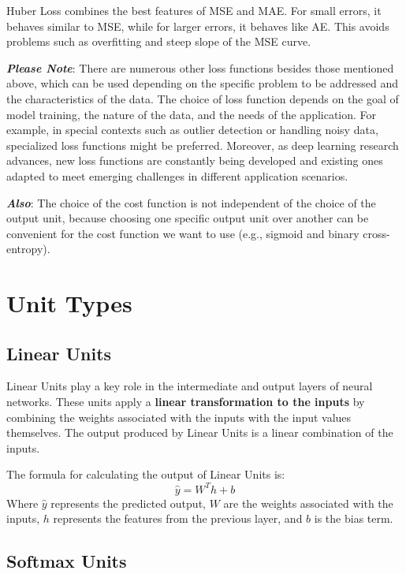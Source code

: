 Huber Loss combines the best features of MSE and MAE. For small errors, it behaves similar to MSE, while for larger errors, it behaves like AE. This avoids problems such as overfitting and steep slope of the MSE curve.

\textit{\textbf{Please Note}}: There are numerous other loss functions besides those mentioned above, which can be used depending on the specific problem to be addressed and the characteristics of the data. The choice of loss function depends on the goal of model training, the nature of the data, and the needs of the application. For example, in special contexts such as outlier detection or handling noisy data, specialized loss functions might be preferred. Moreover, as deep learning research advances, new loss functions are constantly being developed and existing ones adapted to meet emerging challenges in different application scenarios. 

\textit{\textbf{Also}}: The choice of the cost function is not independent of the choice of the output unit, because choosing one specific output unit over another can be convenient for the cost function we want to use (e.g., sigmoid and binary cross-entropy).

\section{Unit Types}

\subsection{Linear Units}

Linear Units play a key role in the intermediate and output layers of neural networks. These units apply a \textbf{linear transformation to the inputs} by combining the weights associated with the inputs with the input values themselves. The output produced by Linear Units is a linear combination of the inputs. 

The formula for calculating the output of Linear Units is:
$$
\hat{y} = W^T h + b
$$
Where \( \hat{y} \) represents the predicted output, \( W \) are the weights associated with the inputs, \( h \) represents the features from the previous layer, and \( b \) is the bias term.

\subsection{Softmax Units}

